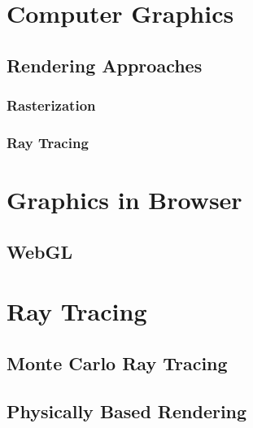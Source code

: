 
\section{Computer Graphics}
\subsection{Rendering Approaches}
\subsubsection{Rasterization}
\subsubsection{Ray Tracing}
\section{Graphics in Browser}
\subsection*{WebGL}
\section{Ray Tracing}
\subsection{Monte Carlo Ray Tracing}
\subsection{Physically Based Rendering}
